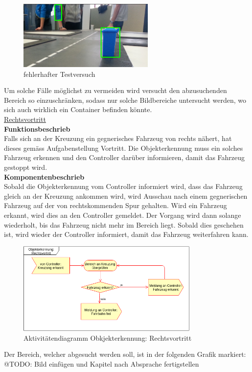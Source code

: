 \begin{figure}[h!]%
\centering
\includegraphics[width=0.6\textwidth]{03_Loesungskonzept/pictures/objekterkennung_blau_fehl.png}
\caption{fehlerhafter Testversuch}
\label{fig:fehlerhafter Testversuch}
\end{figure}
Um solche Fälle möglichst zu vermeiden wird versucht den abzusuchenden Bereich so einzuschränken, sodass nur solche Bildbereiche untersucht werden, wo sich auch wirklich ein Container befinden könnte. 
\\[0.2cm]
\underline{Rechtsvortritt}
\\[0.2cm]
\textbf{Funktionsbeschrieb}\\[0.2cm]
Falls sich an der Kreuzung ein gegnerisches Fahrzeug von rechts nähert, hat dieses gemäss Aufgabenstellung Vortritt. Die Objekterkennung muss ein solches Fahrzeug erkennen und den Controller darüber informieren, damit das Fahrzeug gestoppt wird.
\\[0.2cm]
\textbf{Komponentenbeschrieb}\\[0.2cm]
Sobald die Objekterkennung vom Controller informiert wird, dass das Fahrzeug gleich an der Kreuzung ankommen wird, wird Ausschau nach einem gegnerischen Fahrzeug auf der von rechtskommenden Spur gehalten. Wird ein Fahrzeug erkannt, wird dies an den Controller gemeldet. Der Vorgang wird dann solange wiederholt, bis das Fahrzeug nicht mehr im Bereich liegt. Sobald dies geschehen ist, wird wieder der Controller informiert, damit das Fahrzeug weiterfahren kann.
\begin{figure}[h!]%
\centering
\includegraphics[width=0.8\textwidth]{03_Loesungskonzept/pictures/objekterkennung_rechtsvortritt.png}
\caption{Aktivitätendiagramm Obkjekterkennung: Rechtsvortritt}
\label{fig:activityRechtsvortritt}
\end{figure}
Der Bereich, welcher abgesucht werden soll, ist in der folgenden Grafik markiert:
\\
@TODO: Bild einfügen und Kapitel nach Absprache fertigstellen\\[0.2cm]

